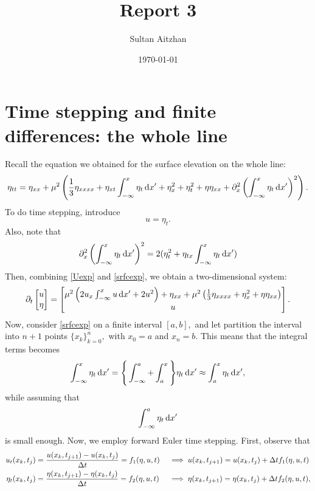 \documentclass[10pt,reqno,oneside,a4paper, landscape]{article}
\author{Sultan Aitzhan}
\title{Report 3}
\date{\today}
\begin{document}
\maketitle
\thispagestyle{fancy}
\tableofcontents


\section{Time stepping and finite differences: the whole line}

Recall the equation we obtained for the surface elevation on the whole line:
\begin{equation}\label{srfcexp}
\eta_{tt} = \eta_{xx} + \mu^2\left( \frac{1}{3} \eta_{xxxx} + \eta_{xt} \int^{x}_{-\infty} \eta_t \,\mathrm{d} x' + \eta^2_x + \eta^2_t +\eta \eta_{xx} + \partial_x^2 \left(\int^{x}_{-\infty} \eta_t \,\mathrm{d} x' \right)^2 \right).
\end{equation}
To do time stepping, introduce
\begin{equation}\label{Uexp}
u = \eta_t.
\end{equation}
Also, note that 
\[ 
\partial_x^2 \left(\int^{x}_{-\infty} \eta_t \,\mathrm{d} x' \right)^2 = 2(\eta_t^2 + \eta_{tx} \int^x_{-\infty}\eta_t \,\mathrm{d} x')
\]
Then, combining \eqref{Uexp} and \eqref{srfcexp}, we obtain a two-dimensional system:
\begin{equation}\label{systemeq1}
  \partial_t \begin{bmatrix} u \\ \eta \end{bmatrix} =
  \begin{bmatrix} 
  \mu^2\left(2 u_{x} \int^{x}_{-\infty} u \,\mathrm{d} x' +2 u^2 \right) + \eta_{xx} + \mu^2 \left( \frac{1}{3} \eta_{xxxx} + \eta^2_x + \eta\eta_{xx} \right) \\
  u \end{bmatrix}.
\end{equation}
Now, consider \eqref{srfcexp} on a finite interval $[a,b],$ and let partition the interval into $n+1$ points $\{ x_k\}^n_{k=0},$ with $x_0 = a$ and $x_n = b.$ This means that the integral terms becomes
\[ 
\int^{x}_{-\infty} \eta_t \,\mathrm{d} x' = \Bigg\{\int^{a}_{-\infty} + \int^x_a \Bigg\} \eta_t \,\mathrm{d} x' \approx \int^x_a \eta_t \,\mathrm{d} x', 
\]
while assuming that 
\[ \int^{a}_{-\infty}  \eta_t \,\mathrm{d} x' \]
is small enough. Now, we employ forward Euler time stepping. First, observe that
\begin{align*}
u_t(x_k, t_j) &= \frac{u(x_k, t_{j+1}) - u(x_k, t_j)}{\Delta t} = f_1(\eta, u, t) &&\implies u(x_k, t_{j+1}) = u(x_k, t_j) + \Delta t f_1(\eta, u, t) \\
\eta_t(x_k, t_j) &= \frac{\eta(x_k, t_{j+1}) - \eta(x_k, t_j)}{\Delta t} = f_2(\eta, u, t) &&\implies \eta(x_k, t_{j+1}) =  \eta(x_k, t_j)+ \Delta t f_2(\eta, u, t), 
\end{align*}
\end{document}
